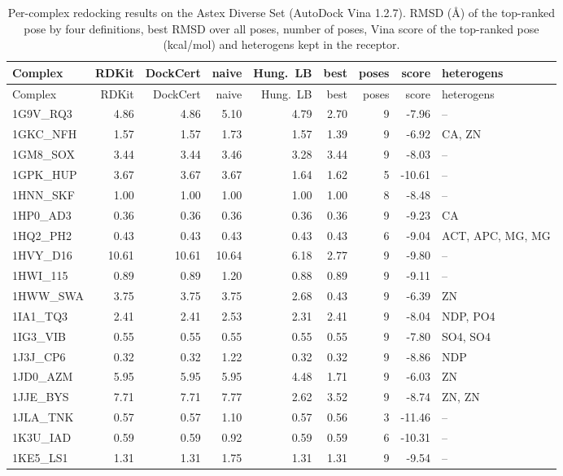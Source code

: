 \begin{longtable}{lrrrrrrrp{2.6cm}}
\caption{Per-complex redocking results on the Astex Diverse Set (AutoDock Vina 1.2.7). RMSD (\AA) of the top-ranked pose by four definitions, best RMSD over all poses, number of poses, Vina score of the top-ranked pose (kcal/mol) and heterogens kept in the receptor.}\label{tab:s_astex}\\
\toprule
Complex & RDKit & DockCert & naive & Hung.\ LB & best & poses & score & heterogens \\
\midrule
\endfirsthead
\toprule
Complex & RDKit & DockCert & naive & Hung.\ LB & best & poses & score & heterogens \\
\midrule
\endhead
1G9V\_RQ3 & 4.86 & 4.86 & 5.10 & 4.79 & 2.70 & 9 & -7.96 & -- \\
1GKC\_NFH & 1.57 & 1.57 & 1.73 & 1.57 & 1.39 & 9 & -6.92 & CA, ZN \\
1GM8\_SOX & 3.44 & 3.44 & 3.46 & 3.28 & 3.44 & 9 & -8.03 & -- \\
1GPK\_HUP & 3.67 & 3.67 & 3.67 & 1.64 & 1.62 & 5 & -10.61 & -- \\
1HNN\_SKF & 1.00 & 1.00 & 1.00 & 1.00 & 1.00 & 8 & -8.48 & -- \\
1HP0\_AD3 & 0.36 & 0.36 & 0.36 & 0.36 & 0.36 & 9 & -9.23 & CA \\
1HQ2\_PH2 & 0.43 & 0.43 & 0.43 & 0.43 & 0.43 & 6 & -9.04 & ACT, APC, MG, MG \\
1HVY\_D16 & 10.61 & 10.61 & 10.64 & 6.18 & 2.77 & 9 & -9.80 & -- \\
1HWI\_115 & 0.89 & 0.89 & 1.20 & 0.88 & 0.89 & 9 & -9.11 & -- \\
1HWW\_SWA & 3.75 & 3.75 & 3.75 & 2.68 & 0.43 & 9 & -6.39 & ZN \\
1IA1\_TQ3 & 2.41 & 2.41 & 2.53 & 2.31 & 2.41 & 9 & -8.04 & NDP, PO4 \\
1IG3\_VIB & 0.55 & 0.55 & 0.55 & 0.55 & 0.55 & 9 & -7.80 & SO4, SO4 \\
1J3J\_CP6 & 0.32 & 0.32 & 1.22 & 0.32 & 0.32 & 9 & -8.86 & NDP \\
1JD0\_AZM & 5.95 & 5.95 & 5.95 & 4.48 & 1.71 & 9 & -6.03 & ZN \\
1JJE\_BYS & 7.71 & 7.71 & 7.77 & 2.62 & 3.52 & 9 & -8.74 & ZN, ZN \\
1JLA\_TNK & 0.57 & 0.57 & 1.10 & 0.57 & 0.56 & 3 & -11.46 & -- \\
1K3U\_IAD & 0.59 & 0.59 & 0.92 & 0.59 & 0.59 & 6 & -10.31 & -- \\
1KE5\_LS1 & 1.31 & 1.31 & 1.75 & 1.31 & 1.31 & 9 & -9.54 & -- \\

\end{longtable}
